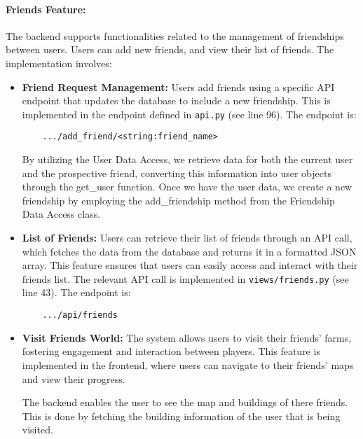 \documentclass[12pt]{article}
\begin{document}
\paragraph{Friends Feature:}
The backend supports functionalities related to the management of friendships between users. Users can add new friends, and view their list of friends. The implementation involves:
\begin{itemize}
    \item \textbf{Friend Request Management:} Users add friends using a specific API endpoint that updates the database to include a new friendship. This is implemented in the endpoint defined in \texttt{api.py} (see line 96). The endpoint is:
    \begin{verbatim}
    .../add_friend/<string:friend_name>
    \end{verbatim}
    By utilizing the User Data Access, we retrieve data for both the current user and the prospective friend, converting this information into user objects through the get\_user function. Once we have the user data, we create a new friendship by employing the add\_friendship method from the Friendship Data Access class.
    \item \textbf{List of Friends:} Users can retrieve their list of friends through an API call, which fetches the data from the database and returns it in a formatted JSON array. This feature ensures that users can easily access and interact with their friends list. The relevant API call is implemented in \texttt{views/friends.py} (see line 43). The endpoint is:
    \begin{verbatim}
    .../api/friends
    \end{verbatim}
    \item \textbf{Visit Friends World:} The system allows users to visit their friends' farms, fostering engagement and interaction between players. This feature is implemented in the frontend, where users can navigate to their friends' maps and view their progress.

    The backend enables the user to see the map and buildings of there friends. This is done by fetching the building information of the user that is being visited.
\end{itemize}
\end{document}
